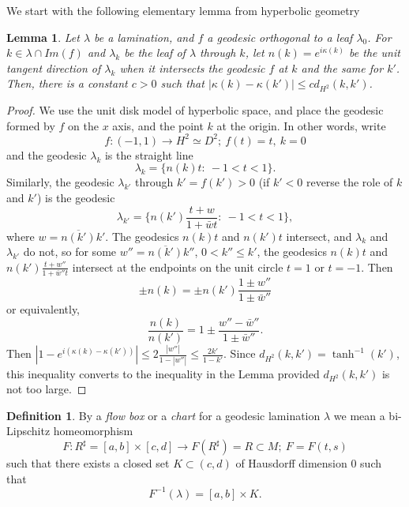 \documentclass{ip-journal}
\newtheorem{lemma}[theorem]{Lemma}
\theoremstyle{definition}
\newtheorem{definition}[theorem]{Definition}
\numberwithin{equation}{section}
\begin{document}
We start with the following elementary lemma from hyperbolic geometry
\begin{lemma}\label {lemma:flow} Let $\lambda$ be a lamination, and $f$ a geodesic orthogonal to a leaf $\lambda_0$. For $k \in \lambda \cap Im(f)$ and $\lambda_k$ be the leaf of $\lambda$ through $k$, let $n(k) =e^{ i \kappa(k)}$ be the unit tangent direction of $\lambda_k$ when it intersects the  geodesic $f$ at $k$ and the same for $k'$. Then, there is a constant $c>0$ such that $|\kappa(k) - \kappa(k')| \leq cd_{H^2}(k,k')$.
\end{lemma}
\begin{proof} We use the unit disk model of hyperbolic space, and place the geodesic formed by $f $ on the $x$ axis, and the point $k$ at the origin. In other words, write 
\[
f: (-1,1) \rightarrow H^2 \simeq D^2; \ f(t)=t, \ k=0
\]
and the geodesic $\lambda_k$ is the straight line
\[
\lambda_k = \{n(k)t: \ -1 < t < 1\}.
\]
Similarly, the geodesic $\lambda_{k'}$ through $k'=f(k')>0$ (if $k'<0$ reverse the role of $k$ and $k'$) is the geodesic
\[
\lambda_{k'}= \{n(k')\frac{t +w}{1 + \bar w t}: \   -1 < t < 1\},
\]
where $w =\overline{ n(k')} k'$.  The geodesics $n(k) t$ and $n(k') t$ intersect, and $\lambda_k$ and $\lambda_{k'}$ do not, so for some $w'' = \overline{ n(k')}k''$, $0 < k'' \leq k'$, the geodesics $n(k) t$ and $n(k')\frac{t + w''}{1 + \bar w'' t}$ intersect at the endpoints on the unit circle $t=1$ or $t= -1$. Then
\[
\pm n(k) = \pm n(k')\frac{1 \pm w''}{1 \pm \bar w''}
\]
or equivalently,
\[
\frac{n(k)}{n(k')} = 1 \pm \frac{w'' - \bar w'' }{1 \pm \bar w''}.
\]
Then $| 1 - e^{i(\kappa(k) - \kappa(k'))}| \leq 2 \frac{|w''|}{1 - |w''|} \leq  \frac{2k'}{1-k'}$.
Since $d_{H^2}(k,k')= \tanh^{-1}(k') $, this inequality converts to the inequality in the Lemma provided $d_{H^2}(k,k')$ is not too large.
\end{proof}

\begin{definition}\label{flowbox} By a {\it flow box} or a {\it chart} for a geodesic lamination $\lambda$ we mean a bi-Lipschitz homeomorphism 
\begin{equation}\label{eqn:flowbox}
F: R^\sharp=[a,b] \times [c,d]  \rightarrow  F(R^\sharp) =R\subset M; \ F=F(t,s)
\end{equation}
such that there exists a closed set $K \subset (c,d)$ of Hausdorff dimension 0 such that
\[
F^{-1}(\lambda)= [a,b] \times K.
\]
\end{definition}
\end{document}
